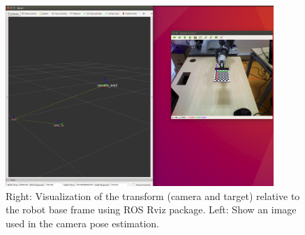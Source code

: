 \begin{figure}[!h]
\begin{center}
\includegraphics[width=4in]{figures03/rviz1.png}
\caption{Right: Visualization of the transform (camera and target) relative to the robot base frame using ROS Rviz package. Left: Show an image used in the camera pose estimation.}
\label{fig:rosCAL}
\end{center}
\end{figure}








































